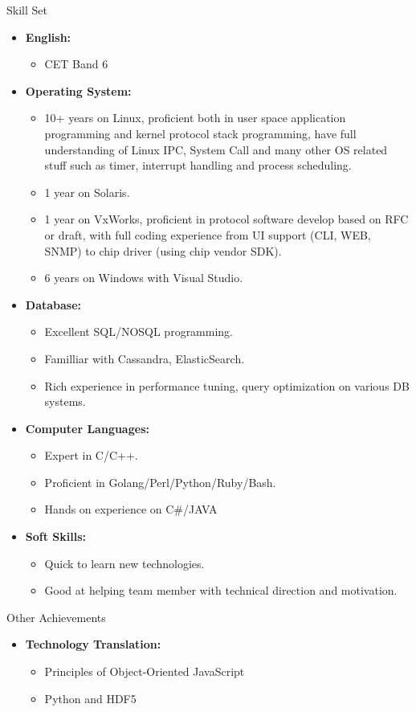 \documentclass[11pt,oneside]{article}
\newenvironment{ressection}[1]{
	\vspace{4pt}
	{\selectfont\Large#1}
	\begin{itemize}
	\vspace{3pt}
}{
	\end{itemize}
}
\newcommand{\resitem}[1]{
	\vspace{-4pt}
	\item \begin{flushleft} #1 \end{flushleft}
}
\newcommand{\ressubitem}[1]{
	\vspace{-1pt}
	\item \begin{flushleft} #1 \end{flushleft}
}
\newenvironment{reslist}[1]{
	\resitem{\textbf{#1}}
	\vspace{-5pt}
	\begin{itemize}
}{
	\end{itemize}
}
\begin{document}
\begin{ressection}{Skill Set}

	\begin{reslist}{English:}
		\ressubitem{CET Band 6}
	\end{reslist}

	\begin{reslist}{Operating System:}
		\ressubitem{10+ years on Linux, proficient both in user space application programming and kernel
					protocol stack programming, have full understanding of Linux IPC, System Call and
					many other OS related stuff such as timer, interrupt handling and process scheduling.}
		\ressubitem{1 year on Solaris.}
		\ressubitem{1 year on VxWorks, proficient in protocol software develop based on RFC or draft, with
					full coding experience from UI support (CLI, WEB, SNMP) to chip driver (using chip
					vendor SDK).}
		\ressubitem{6 years on Windows with Visual Studio.}
	\end{reslist}

	\begin{reslist}{Database:}
		\ressubitem{Excellent SQL/NOSQL programming.}
		\ressubitem{Familliar with Cassandra, ElasticSearch.}
		\ressubitem{Rich experience in performance tuning, query optimization on various DB systems.}
	\end{reslist}

	\begin{reslist}{Computer Languages:}
		\ressubitem{Expert in C/C++.}
		\ressubitem{Proficient in Golang/Perl/Python/Ruby/Bash.}
		\ressubitem{Hands on experience on C\#/JAVA}
	\end{reslist}

	\begin{reslist}{Soft Skills:}
		\ressubitem{Quick to learn new technologies.}
		\ressubitem{Good at helping team member with technical direction and motivation.}
	\end{reslist}

\end{ressection}

\begin{ressection}{Other Achievements}

	\begin{reslist}{Technology Translation:}
		\ressubitem{Principles of Object-Oriented JavaScript}
		\ressubitem{Python and HDF5}
	\end{reslist}

\end{ressection}
\end{document}

